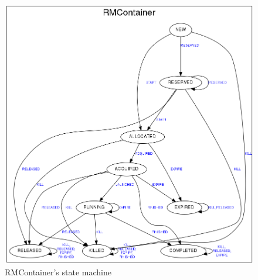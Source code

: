 \begin{figure}[hbtn]
   \centering
   \renewcommand{\figurename}{Figure}
   \includegraphics[width=15cm]{figuras/Figura03-RMContainer.png}
   \caption{RMContainer's state machine}
   \label{fig:RMContainer}
\end{figure}

